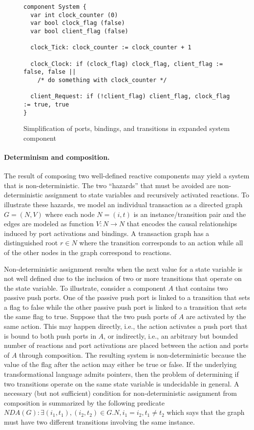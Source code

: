 \begin{figure}
\begin{verbatim}
component System {
  var int clock_counter (0)
  var bool clock_flag (false)
  var bool client_flag (false)

  clock_Tick: clock_counter := clock_counter + 1

  clock_Clock: if (clock_flag) clock_flag, client_flag := false, false ||
    /* do something with clock_counter */

  client_Request: if (!client_flag) client_flag, clock_flag := true, true
}
\end{verbatim}
\caption{Simplification of ports, bindings, and transitions in expanded system component\label{se2}}
\end{figure}

\paragraph{Determinism and composition.}
The result of composing two well-defined reactive components may yield a system that is non-deterministic.
The two ``hazards'' that must be avoided are non-deterministic assignment to state variables and recursively activated reactions.
To illustrate these hazards, we model an individual transaction as a directed graph $G = (N,V)$ where each node $N=(i,t)$ is an instance/transition pair and the edges are modeled as function $V: N \to N$ that encodes the causal relationships induced by port activations and bindings.
A transaction graph has a distinguished root $r \in N$ where the transition corresponds to an action while all of the other nodes in the graph correspond to reactions.

Non-deterministic assignment results when the next value for a state variable is not well defined due to the inclusion of two or more transitions that operate on the state variable.
To illustrate, consider a component $A$ that contains two passive push ports.
One of the passive push port is linked to a transition that sets a flag to false while the other passive push port is linked to a transition that sets the same flag to true.
Suppose that the two push ports of $A$ are activated by the same action.
This may happen directly, i.e., the action activates a push port that is bound to both push ports in $A$, or indirectly, i.e., an arbitrary but bounded number of reactions and port activations are placed between the action and ports of $A$ through composition.
The resulting system is non-deterministic because the value of the flag after the action may either be true or false.
If the underlying transformational language admits pointers, then the problem of determining if two transitions operate on the same state variable is undecidable in general.
A necessary (but not sufficient) condition for non-deterministic assignment from composition is summarized by the following predicate $NDA(G): \exists (i_1, t_1), (i_2, t_2) \in G.N, i_1 = i_2, t_1 \ne t_2$ which says that the graph must have two different transitions involving the same instance.

